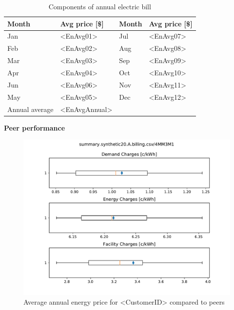 \documentclass[11pt]{article}
\begin{document}
\begin{table}[th!]
  \centering
  \caption{Components of annual electric bill}
  \vspace{1.5ex}
  \label{tab:annual}
  \begin{tabular}{llll}
    Month & Avg price [\$] & Month & Avg price [\$] \\
    \midrule
    Jan & <EnAvg01> & Jul & <EnAvg07> \\
    Feb & <EnAvg02> & Aug & <EnAvg08> \\
    Mar & <EnAvg03> & Sep & <EnAvg09> \\
    Apr & <EnAvg04> & Oct & <EnAvg10> \\
    Jun & <EnAvg06> & Nov & <EnAvg11> \\
    May & <EnAvg05> & Dec & <EnAvg12> \\
    \midrule
    Annual average & <EnAvgAnnual>
  \end{tabular}
\end{table}

\vspace{3ex}
\textbf{\Large Peer performance}
\vspace{1ex}

\lipsum[1][1-7]

\begin{figure}[!h]
\centering
\includegraphics[width=\columnwidth, page=1, trim=0in 2.1in 0in 2.25in, clip]{visuals/synthetic20.A.whisker.pdf}
\caption{Average annual energy price for <CustomerID> compared to peers}
\label{fig:PeerCompEn}
\end{figure}

\clearpage
\end{document}
